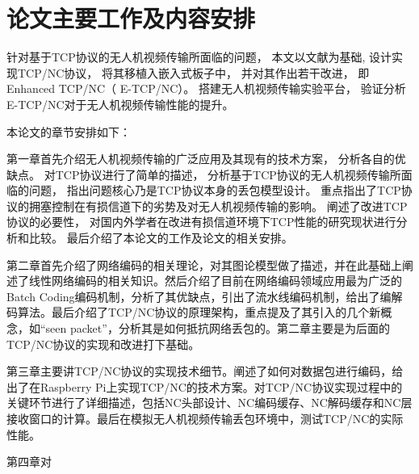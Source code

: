 \section{论文主要工作及内容安排}
针对基于TCP协议的无人机视频传输所面临的问题，
本文以文献\cite{Sundararajan2009}为基础,
设计实现TCP/NC协议，
将其移植入嵌入式板子中，
并对其作出若干改进，
即Enhanced TCP/NC（ E-TCP/NC）。
搭建无人机视频传输实验平台，
验证分析E-TCP/NC对于无人机视频传输性能的提升。
\par
本论文的章节安排如下：
\par
第一章首先介绍无人机视频传输的广泛应用及其现有的技术方案，
分析各自的优缺点。
对TCP协议进行了简单的描述，
分析基于TCP协议的无人机视频传输所面临的问题，
指出问题核心乃是TCP协议本身的丢包模型设计。
重点指出了TCP协议的拥塞控制在有损信道下的劣势及对无人机视频传输的影响。
阐述了改进TCP协议的必要性，
对国内外学者在改进有损信道环境下TCP性能的研究现状进行分析和比较。
最后介绍了本论文的工作及论文的相关安排。
\par
第二章首先介绍了网络编码的相关理论，对其图论模型做了描述，并在此基础上阐述了线性网络编码的相关知识。然后介绍了目前在网络编码领域应用最为广泛的Batch Coding编码机制，分析了其优缺点，引出了流水线编码机制，给出了编解码算法。最后介绍了TCP/NC协议的原理架构，重点提及了其引入的几个新概念，如“seen packet”，分析其是如何抵抗网络丢包的。第二章主要是为后面的TCP/NC协议的实现和改进打下基础。 
\par
第三章主要讲TCP/NC协议的实现技术细节。阐述了如何对数据包进行编码，给出了在Raspberry Pi上实现TCP/NC的技术方案。对TCP/NC协议实现过程中的关键环节进行了详细描述，包括NC头部设计、NC编码缓存、NC解码缓存和NC层接收窗口的计算。最后在模拟无人机视频传输丢包环境中，测试TCP/NC的实际性能。
\par
第四章对

